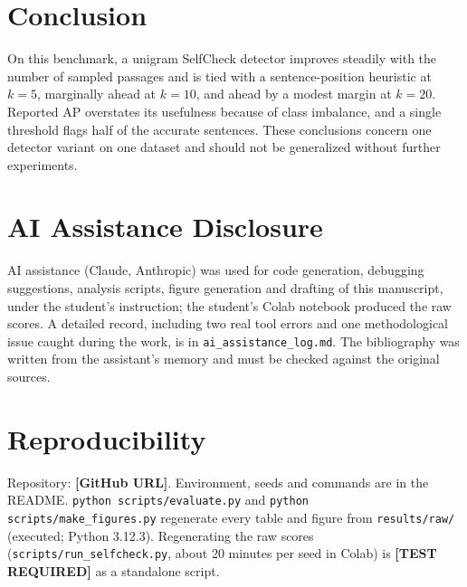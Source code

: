 \documentclass[10pt,twocolumn]{article}
\newcommand{\todo}[1]{\textbf{[#1]}}
\begin{document}
\section{Conclusion}
On this benchmark, a unigram SelfCheck detector improves steadily with the number of sampled passages and is tied with a sentence-position heuristic at $k=5$, marginally ahead at $k=10$, and ahead by a modest margin at $k=20$. Reported AP overstates its usefulness because of class imbalance, and a single threshold flags half of the accurate sentences. These conclusions concern one detector variant on one dataset and should not be generalized without further experiments.

\section*{AI Assistance Disclosure}
AI assistance (Claude, Anthropic) was used for code generation, debugging suggestions, analysis scripts, figure generation and drafting of this manuscript, under the student's instruction; the student's Colab notebook produced the raw scores. A detailed record, including two real tool errors and one methodological issue caught during the work, is in \texttt{ai\_assistance\_log.md}. The bibliography was written from the assistant's memory and must be checked against the original sources.

\section*{Reproducibility}
Repository: \todo{GitHub URL}. Environment, seeds and commands are in the README. \texttt{python scripts/evaluate.py} and \texttt{python scripts/make\_figures.py} regenerate every table and figure from \texttt{results/raw/} (executed; Python 3.12.3). Regenerating the raw scores (\texttt{scripts/run\_selfcheck.py}, about 20 minutes per seed in Colab) is \todo{TEST REQUIRED} as a standalone script.



\end{document}
